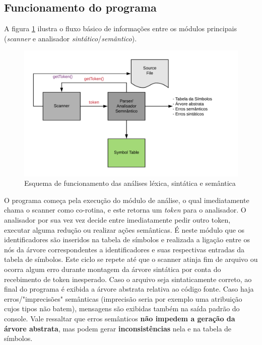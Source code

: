 \documentclass[
	article,			%
	11pt,				%
	oneside,			%
	a4paper,			%
	english,			%
	brazil,				%
	sumario=tradicional
	]{abntex2}
\renewcommand{\it}[1]{\textit{#1}}
\renewcommand{\bf}[1]{\textbf{#1}}
\begin{document}
\subsection{Funcionamento do programa}

A figura \ref{esquema} ilustra o fluxo básico de informações entre os módulos principais (\it{scanner} e analisador \it{sintático}/\it{semântico}).

\begin{figure}[hbt!]
	\caption{Esquema de funcionamento das análises léxica, sintática e semântica}
	\label{esquema}
	\centering
	\includegraphics[scale=0.8]{img/diagrama-tradutores.png}
\end{figure}

O programa começa pela execução do módulo de análise, o qual imediatamente chama o scanner como co-rotina, e este retorna um \it{token} para o analisador. O analisador por sua vez vez decide entre
imediatamente pedir outro token, executar alguma redução ou realizar ações semânticas. É neste módulo que os identificadores são inseridos na tabela
de símbolos e realizada a ligação entre os nós da árvore correspondentes a identificadores e suas respectivas entradas da tabela de símbolos. Este
ciclo se repete até que o scanner atinja fim de arquivo ou ocorra algum erro durante montagem da árvore sintática por conta do recebimento de
token inesperado. Caso o arquivo seja sintaticamente correto, ao final do programa é exibida a árvore abstrata relativa ao código fonte. Caso
haja erros/"imprecisões" semânticas (imprecisão seria por exemplo uma atribuição cujos tipos não batem), mensagens são exibidas também na saída padrão do console. Vale ressaltar que erros semânticos \bf{não impedem a geração da árvore abstrata}, mas podem gerar \bf{inconsistências} nela e na tabela de símbolos.
\end{document}

